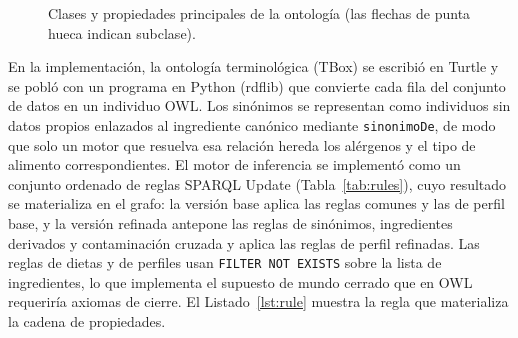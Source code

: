 \documentclass[conference]{IEEEtran}
\begin{document}
\begin{figure}[t]
\centering
{}
\caption{Clases y propiedades principales de la ontología (las flechas de punta hueca indican subclase).}
\label{fig:classes}
\end{figure}

En la implementación, la ontología terminológica (TBox) se escribió en Turtle y se pobló con un programa en Python (rdflib) que convierte cada fila del conjunto de datos en un individuo OWL. Los sinónimos se representan como individuos sin datos propios enlazados al ingrediente canónico mediante \texttt{sinonimoDe}, de modo que solo un motor que resuelva esa relación hereda los alérgenos y el tipo de alimento correspondientes. El motor de inferencia se implementó como un conjunto ordenado de reglas SPARQL Update (Tabla~\ref{tab:rules}), cuyo resultado se materializa en el grafo: la versión base aplica las reglas comunes y las de perfil base, y la versión refinada antepone las reglas de sinónimos, ingredientes derivados y contaminación cruzada y aplica las reglas de perfil refinadas. Las reglas de dietas y de perfiles usan \texttt{FILTER NOT EXISTS} sobre la lista de ingredientes, lo que implementa el supuesto de mundo cerrado que en OWL requeriría axiomas de cierre. El Listado~\ref{lst:rule} muestra la regla que materializa la cadena de propiedades.
\end{document}

